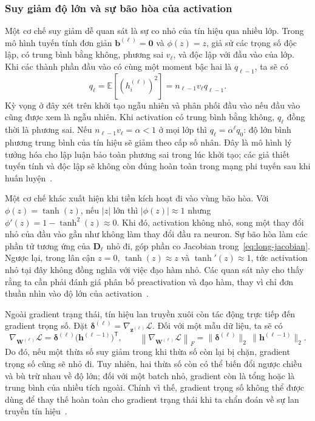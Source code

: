 \documentclass[12pt]{article}
\begin{document}
\subsubsection{Suy giảm độ lớn và sự bão hòa của activation}
Một cơ chế suy giảm dễ quan sát là sự co nhỏ của tín hiệu qua nhiều lớp. Trong mô hình tuyến tính đơn giản $\mathbf b^{(\ell)}=\mathbf0$ và $\phi(z)=z$, giả sử các trọng số độc lập, có trung bình bằng không, phương sai $v_\ell$, và độc lập với đầu vào của lớp. Khi các thành phần đầu vào có cùng một moment bậc hai là $q_{\ell-1}$, ta sẽ có
\begin{equation}
 q_\ell=\mathbb E\!\left[(h_i^{(\ell)})^2\right]
 =n_{\ell-1}v_\ell q_{\ell-1}.
 \label{eq:long-linear-variance}
\end{equation}
Kỳ vọng ở đây xét trên khởi tạo ngẫu nhiên và phân phối đầu vào nếu đầu vào cũng được xem là ngẫu nhiên. Khi activation có trung bình bằng không, $q_\ell$ đồng thời là phương sai. Nếu $n_{\ell-1}v_\ell=\alpha<1$ ở mọi lớp thì $q_\ell=\alpha^\ell q_0$: độ lớn bình phương trung bình của tín hiệu sẽ giảm theo cấp số nhân. Đây là mô hình lý tưởng hóa cho lập luận bảo toàn phương sai trong lúc khởi tạo; các giả thiết tuyến tính và độc lập sẽ không còn đúng hoàn toàn trong mạng phi tuyến sau khi huấn luyện~\cite[\S4.2]{glorot2010}.

Một cơ chế khác xuất hiện khi tiền kích hoạt đi vào vùng bão hòa. Với $\phi(z)=\tanh(z)$, nếu $|z|$ lớn thì $|\phi(z)|\approx1$ nhưng $\phi'(z)=1-\tanh^2(z)\approx0$. Khi đó, activation không nhỏ, song một thay đổi nhỏ của đầu vào gần như không làm thay đổi đầu ra neuron. Sự bão hòa làm các phần tử tương ứng của $\mathbf D_\ell$ nhỏ đi, góp phần co Jacobian trong~\eqref{eq:long-jacobian}. Ngược lại, trong lân cận $z=0$, $\tanh(z)\approx z$ và $\tanh'(z)\approx1$, tức activation nhỏ tại đây không đồng nghĩa với việc đạo hàm nhỏ. Các quan sát này cho thấy rằng ta cần phải đánh giá phân bố preactivation và đạo hàm, thay vì chỉ đơn thuần nhìn vào độ lớn của activation~\cite[\S3]{glorot2010}.

Ngoài gradient trạng thái, tín hiệu lan truyền xuôi còn tác động trực tiếp đến gradient trọng số. Đặt $\boldsymbol\delta^{(\ell)}=\nabla_{\mathbf z^{(\ell)}}\mathcal L$. Đối với một mẫu dữ liệu, ta sẽ có
\begin{equation}
 \nabla_{\mathbf W^{(\ell)}}\mathcal L
 =\boldsymbol\delta^{(\ell)}\big(\mathbf h^{(\ell-1)}\big)^{\mathsf T},\qquad
 \left\|\nabla_{\mathbf W^{(\ell)}}\mathcal L\right\|_F
 =\|\boldsymbol\delta^{(\ell)}\|_2\,\|\mathbf h^{(\ell-1)}\|_2.
 \label{eq:long-weight-gradient}
\end{equation}
Do đó, nếu một thừa số suy giảm trong khi thừa số còn lại bị chặn, gradient trọng số cũng sẽ nhỏ đi. Tuy nhiên, hai thừa số còn có thể biến đổi ngược chiều và bù trừ nhau về độ lớn; đối với một batch nhỏ, gradient còn là tổng hoặc là trung bình của nhiều tích ngoài. Chính vì thế, gradient trọng số không thể được dùng để thay thế hoàn toàn cho gradient trạng thái khi ta chẩn đoán về sự lan truyền tín hiệu~\cite[\S4.2--4.3]{glorot2010}.
\end{document}
